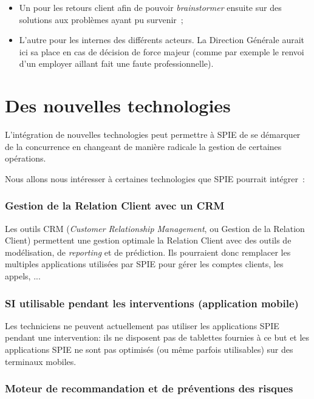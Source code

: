 \begin{itemize}
    \item Un pour les retours client afin de pouvoir \textit{brainstormer} ensuite sur des solutions aux problèmes ayant
    pu survenir~;
    \item L'autre pour les internes des différents acteurs. La Direction Générale aurait ici sa place en cas
    de décision de force majeur (comme par exemple le renvoi d'un employer aillant fait une faute professionnelle).
\end{itemize}


\section{Des nouvelles technologies}

L'intégration de nouvelles technologies peut permettre à SPIE de se démarquer de la concurrence en changeant de manière radicale la gestion de certaines opérations.

Nous allons nous intéresser à certaines technologies que SPIE pourrait intégrer~:


    \subsubsection{Gestion de la Relation Client avec un CRM}

        Les outils CRM (\textit{Customer Relationship Management}, ou Gestion de la Relation Client) permettent une gestion optimale la Relation Client avec des outils de modélisation, de \textit{reporting} et de prédiction. Ils pourraient donc remplacer les multiples applications utilisées par SPIE pour gérer les comptes clients, les appels, ...

    \subsubsection{SI utilisable pendant les interventions (application mobile)}

        Les techniciens ne peuvent actuellement pas utiliser les applications SPIE pendant une intervention: ils ne disposent pas de tablettes fournies à ce but et les applications SPIE ne sont pas optimisés (ou même parfois utilisables) sur des terminaux mobiles.

    \subsubsection{Moteur de recommandation et de préventions des risques}

